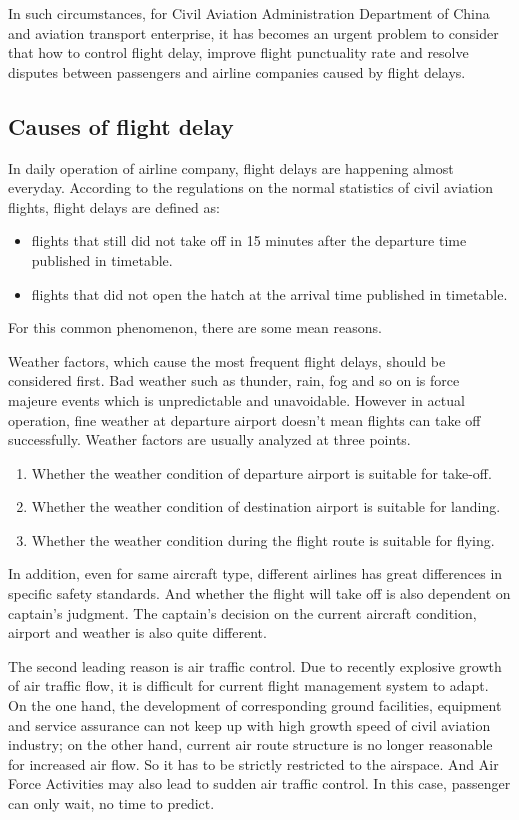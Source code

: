 \documentclass[senior]{IPSstyle}
\begin{document}
In such circumstances, for Civil Aviation Administration Department of China and aviation transport enterprise, it has becomes an urgent problem to consider that how to control flight delay, improve flight punctuality rate and resolve disputes between passengers and airline companies caused by flight delays.

\subsection{Causes of flight delay}
In daily operation of airline company, flight delays are happening almost everyday.
According to the regulations on the normal statistics of civil aviation flights, flight delays are defined as:
\begin{itemize}
    \item flights that still did not take off in 15 minutes after the departure time published in timetable.
    \item flights that did not open the hatch at the arrival time published in timetable.
\end{itemize}
For this common phenomenon, there are some mean reasons. 

Weather factors, which cause the most frequent flight delays, should be considered first. 
Bad weather such as thunder, rain, fog and so on is force majeure events which is unpredictable and unavoidable. 
However in actual operation, fine weather at departure airport doesn’t mean flights can take off successfully. 
Weather factors are usually analyzed at three points.
\begin{enumerate}
\item Whether the weather condition of departure airport is suitable for take-off. 
\item Whether the weather condition of destination airport is suitable for landing.
\item Whether the weather condition during the flight route is suitable for flying.
\end{enumerate}

In addition, even for same aircraft type, different airlines has great differences in specific safety standards.
And whether the flight will take off is also dependent on captain's judgment. 
The captain's decision on the current aircraft condition, airport and weather is also quite different.

The second leading reason is air traffic control. 
Due to recently explosive growth of air traffic flow, it is difficult for current flight management system to adapt. 
On the one hand, the development of corresponding ground facilities, equipment and service assurance can not keep up with high growth speed of civil aviation industry; 
on the other hand, current air route structure is no longer reasonable for increased air flow. 
So it has to be strictly restricted to the airspace.
And Air Force Activities may also lead to sudden air traffic control. In this case, passenger can only wait, no time to predict.
\end{document}

